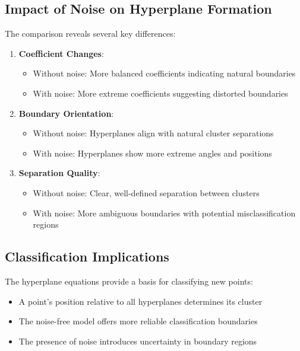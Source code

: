 \documentclass[12pt]{article}
\begin{document}
\subsection{Impact of Noise on Hyperplane Formation}
The comparison reveals several key differences:
\begin{enumerate}
    \item \textbf{Coefficient Changes}:
    \begin{itemize}
        \item Without noise: More balanced coefficients indicating natural boundaries
        \item With noise: More extreme coefficients suggesting distorted boundaries
    \end{itemize}
    
    \item \textbf{Boundary Orientation}:
    \begin{itemize}
        \item Without noise: Hyperplanes align with natural cluster separations
        \item With noise: Hyperplanes show more extreme angles and positions
    \end{itemize}
    
    \item \textbf{Separation Quality}:
    \begin{itemize}
        \item Without noise: Clear, well-defined separation between clusters
        \item With noise: More ambiguous boundaries with potential misclassification regions
    \end{itemize}
\end{enumerate}

\subsection{Classification Implications}
The hyperplane equations provide a basis for classifying new points:
\begin{itemize}
    \item A point's position relative to all hyperplanes determines its cluster
    \item The noise-free model offers more reliable classification boundaries
    \item The presence of noise introduces uncertainty in boundary regions
\end{itemize}
\end{document}
